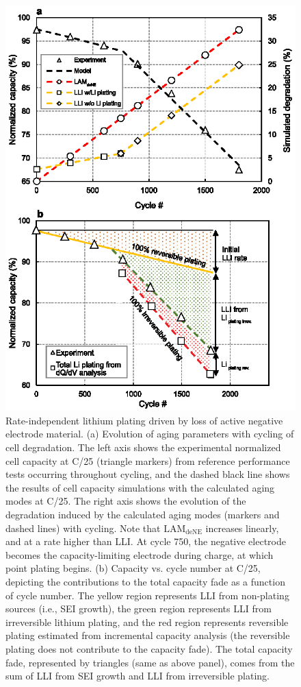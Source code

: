 \documentclass[journal=jpclcd,manuscript=article]{achemso}
\begin{document}
\begin{figure}[p]
    \centering
    \includegraphics[scale=1]{figures/thermo_plating_dubarry.eps}
    \caption{Rate-independent lithium plating driven by loss of active negative electrode material. (a) Evolution of aging parameters with cycling of cell degradation. The left axis shows the experimental normalized cell capacity at C/25 (triangle markers) from reference performance tests occurring throughout cycling, and the dashed black line shows the results of cell capacity simulations with the calculated aging modes at C/25. The right axis shows the evolution of the degradation induced by the calculated aging modes (markers and dashed lines) with cycling. Note that $\mathrm{LAM_{deNE}}$ increases linearly, and at a rate higher than LLI. At cycle 750, the negative electrode becomes the capacity-limiting electrode during charge, at which point plating begins.
    (b) Capacity vs. cycle number at C/25, depicting the contributions to the total capacity fade as a function of cycle number. The yellow region represents LLI from non-plating sources (i.e., SEI growth), the green region represents LLI from irreversible lithium plating, and the red region represents reversible plating estimated from incremental capacity analysis (the reversible plating does not contribute to the capacity fade). The total capacity fade, represented by triangles (same as above panel), comes from the sum of LLI from SEI growth and LLI from irreversible plating.
}
\end{figure}
\end{document}
